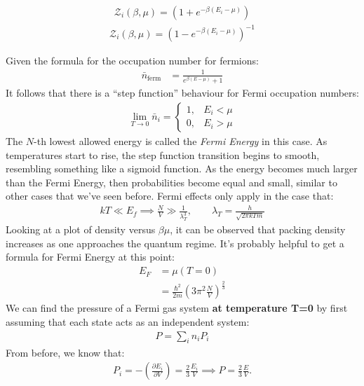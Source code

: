 \documentclass{article}
\begin{document}
\begin{align*}
  \mathcal{Z}_i(\beta, \mu) = (1 + e^{-\beta(E_i - \mu)})
\end{align*}
\begin{align*}
  \mathcal{Z}_i(\beta, \mu) = (1 - e^{-\beta(E_i - \mu)})^{-1}
\end{align*}

Given the formula for the occupation number for fermions:
\begin{align*}
  \bar{n}_\text{ferm} &= \frac{1}{e^{\beta(E-\mu)} + 1}  
\end{align*}
It follows that there is a ``step function'' behaviour for Fermi occupation numbers:
\begin{align*}
  \lim_{T \to 0} \bar{n}_i = \begin{cases}
    1, & E_i < \mu \\
    0, & E_i > \mu
  \end{cases}
\end{align*}
The $N$-th lowest allowed energy is called the \textit{Fermi Energy} in this case. As temperatures start to rise, the step function transition begins to smooth, resembling something like a sigmoid function. As the energy becomes much larger than the Fermi Energy, then probabilities become equal and small, similar to other cases that we've seen before.
\gap
Fermi effects only apply in the case that:
\begin{align*}
  kT \ll E_f \implies \frac{N}{V} \gg \frac{1}{\lambda_T^3}, \qquad \lambda_T = \frac{h}{\sqrt{2\pi kTm}}
\end{align*}
Looking at a plot of density versus $\beta\mu$, it can be observed that packing density increases as one approaches the quantum regime.
\gap
{} It's probably helpful to get a formula for Fermi Energy at this point:
\begin{align*}
  E_F &= \mu(T = 0)\\
  &= \frac{\hbar^2}{2m} \left(3\pi^2 \frac{N}{V}\right)^{\frac{2}{3}}
\end{align*}
 We can find the pressure of a Fermi gas system {\bf at temperature T=0} by first assuming that each state acts as an independent system:
\begin{align*}
  P = \sum_i n_i P_i
\end{align*}
From before, we know that:
\begin{align*}
  P_i = - \left(\frac{\partial E_i}{\partial V}\right) = \frac{2}{3} \frac{E_i}{V} \implies P = \frac{2}{3} \frac{E}{V}.
\end{align*}
\end{document}
